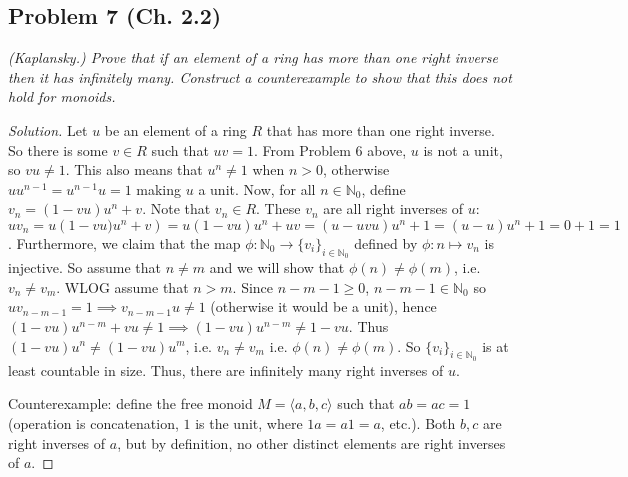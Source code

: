 \documentclass{article}
\newcommand{\N}{{\mathbb N}}
\begin{document}
\subsection*{Problem 7 (Ch. 2.2)}
{\it (Kaplansky.) Prove that if an element of a ring has more than one
right inverse then it has infinitely many.
Construct a counterexample to show that this does not hold for monoids.}
\begin{proof}[Solution]\let\qed\relax
	Let $u$ be an element of a ring $R$ that has more than one right inverse.
	So there is some $v \in R$ such that $uv = 1$.
	From Problem 6 above, $u$ is not a unit, so $vu \neq 1$.
	This also means that $u^n \neq 1$ when $n > 0$,
	otherwise $uu^{n-1} = u^{n-1}u = 1$ making $u$ a unit.
	Now, for all $n \in \N_0$, define $v_n = (1-vu)u^n + v$.
	Note that $v_n \in R$.
	These $v_n$ are all right inverses of $u$:
	$uv_n = u\left(1-vu)u^n + v\right) = u(1-vu)u^n + uv = (u - uvu)u^n + 1
	= (u - u)u^n + 1 = 0 + 1 = 1$.
	Furthermore, we claim that the map $\phi \colon \N_0 \to \{v_i\}_{i\in\N_0}$
	defined by $\phi \colon n \mapsto v_n$ is injective.
	So assume that $n \neq m$ and we will show that $\phi(n) \neq \phi(m)$,
	i.e. $v_n \neq v_m$.
	WLOG assume that $n > m$.
	Since $n-m-1 \geq 0$, $n-m-1 \in \N_0$
	so $uv_{n-m-1} = 1 \implies v_{n-m-1}u \neq 1$ (otherwise it would be a unit),
	hence $(1-vu)u^{n-m} + vu \neq 1 \implies (1-vu)u^{n-m}\neq 1-vu$.
	Thus $(1-vu)u^n \neq (1-vu)u^m$, i.e. $v_n \neq v_m$ i.e. $\phi(n) \neq \phi(m)$.
	So $\{v_i\}_{i\in\N_0}$ is at least countable in size.
	Thus, there are infinitely many right inverses of $u$.

	Counterexample: define the free monoid $M = \langle a,b,c\rangle$
	such that $ab = ac = 1$
	(operation is concatenation, $1$ is the unit, where $1a = a1 = a$, etc.).
	Both $b,c$ are right inverses of $a$,
	but by definition, no other distinct elements are right inverses of $a$.
\end{proof}
\end{document}
